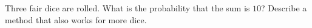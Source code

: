 Three fair dice are rolled. What is the probability that the sum is $10$? Describe a method that also works for more dice.
